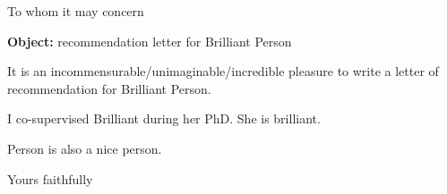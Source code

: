 \documentclass{letter}
\begin{document}

\begin{letter}{To whom it may concern}
\opening{\textbf{Object:} recommendation letter for Brilliant Person}
It is an incommensurable/unimaginable/incredible pleasure to write a letter of recommendation for Brilliant Person.

I co-supervised Brilliant during her PhD. She is brilliant.

Person is also a nice person.
%
\closing{Yours faithfully}
\end{letter}
\end{document}
